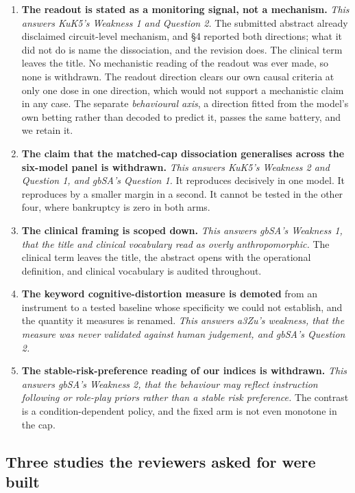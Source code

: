 \documentclass[11pt]{article}
\begin{document}
\begin{enumerate}[leftmargin=1.6em]
\item \textbf{The readout is stated as a monitoring signal, not a mechanism.} \emph{This answers
KuK5's Weakness 1 and Question 2.} The submitted abstract already disclaimed circuit-level
mechanism, and \S4 reported both directions; what it did not do is name the dissociation, and the
revision does. The clinical term leaves the title. No mechanistic reading of the readout was ever
made, so none is withdrawn. The readout
direction clears our own causal criteria at only one dose in one direction, which would not
support a mechanistic claim in any case. The separate \emph{behavioural axis}, a direction fitted
from the model's own betting rather than decoded to predict it, passes the same battery, and we
retain it.

\item \textbf{The claim that the matched-cap dissociation generalises across the six-model panel
is withdrawn.} \emph{This answers KuK5's Weakness 2 and Question 1, and gbSA's Question 1.} It
reproduces decisively in one model. It reproduces by a smaller margin in a second. It cannot be
tested in the other four, where bankruptcy is zero in both arms.

\item \textbf{The clinical framing is scoped down.} \emph{This answers gbSA's Weakness 1, that
the title and clinical vocabulary read as overly anthropomorphic.} The clinical term leaves the
title, the abstract opens with the operational definition, and clinical vocabulary is audited
throughout.

\item \textbf{The keyword cognitive-distortion measure is demoted} from an instrument to a tested
baseline whose specificity we could not establish, and the quantity it measures is renamed.
\emph{This answers a3Zu's weakness, that the measure was never validated against human judgement,
and gbSA's Question 2.}

\item \textbf{The stable-risk-preference reading of our indices is withdrawn.} \emph{This answers
gbSA's Weakness 2, that the behaviour may reflect instruction following or role-play priors
rather than a stable risk preference.} The contrast is a condition-dependent policy, and the
fixed arm is not even monotone in the cap.
\end{enumerate}

\subsection*{Three studies the reviewers asked for were built}
\end{document}
